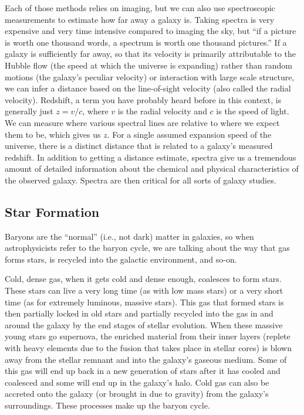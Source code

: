 Each of those methods relies on imaging, but we can also use spectroscopic measurements to estimate how far away a galaxy is. Taking spectra is very expensive and very time intensive compared to imaging the sky, but ``if a picture is worth one thousand words, a spectrum is worth one thousand pictures.'' If a galaxy is sufficiently far away, so that its velocity is primarily attributable to the Hubble flow (the speed at which the universe is expanding) rather than random motions (the galaxy's peculiar velocity) or interaction with large scale structure, we can infer a distance based on the line-of-sight velocity (also called the radial velocity). Redshift, a term you have probably heard before in this context, is generally just $z = v/c$, where $v$ is the radial velocity and $c$ is the speed of light. We can measure where various spectral lines are relative to where we expect them to be, which gives us $z$. For a single assumed expansion speed of the universe, there is a distinct distance that is related to a galaxy's measured redshift. In addition to getting a distance estimate, spectra give us a tremendous amount of detailed information about the chemical and physical characteristics of the observed galaxy. Spectra are then critical for all sorts of galaxy studies. 

\vspace{-10pt}

\subsection{Star Formation}

Baryons are the ``normal'' (i.e., not dark) matter in galaxies, so when astrophysicists refer to the baryon cycle, we are talking about the way that gas forms stars, is recycled into the galactic environment, and so-on.

Cold, dense gas, when it gets cold and dense enough, coalesces to form stars. These stars can live a very long time (as with low mass stars) or a very short time (as for extremely luminous, massive stars). This gas that formed stars is then partially locked in old stars and partially recycled into the gas in and around the galaxy by the end stages of stellar evolution. When these massive young stars go supernova, the enriched material from their inner layers (replete with heavy elements due to the fusion that takes place in stellar cores) is blown away from the stellar remnant and into the galaxy's gaseous medium. Some of this gas will end up back in a new generation of stars after it has cooled and coalesced and some will end up in the galaxy's halo. Cold gas can also be accreted onto the galaxy (or brought in due to gravity) from the galaxy's surroundings. These processes make up the baryon cycle.

